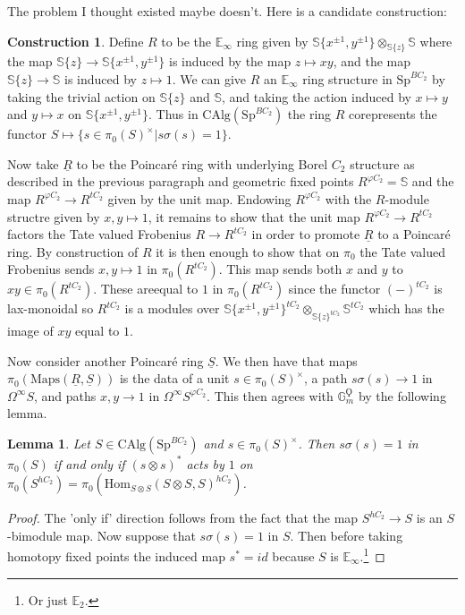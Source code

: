 \documentclass{article}
\renewcommand{\phi}{\varphi}
\newtheorem{lemma}[theorem]{Lemma}
\theoremstyle{definition}
\newtheorem{construction}[theorem]{Construction}
\begin{document}
The problem I thought existed maybe doesn't. Here is a candidate construction:

\begin{construction}
Define $R$ to be the $\mathbb{E}_\infty$ ring given by $\mathbb{S}\{x^{\pm 1}, y^{\pm 1}\}\otimes_{\mathbb{S}\{z\}}\mathbb{S}$ where the map $\mathbb{S}\{z\}\to \mathbb{S}\{x^{\pm 1}, y^{\pm 1}\}$ is induced by the map $z\mapsto xy$, and the map $\mathbb{S}\{z\}\to \mathbb{S}$ is induced by $z\mapsto 1$. We can give $R$ an $\mathbb{E}_\infty$ ring structure in $\mathrm{Sp}^{BC_2}$ by taking the trivial action on $\mathbb{S}\{z\}$ and $\mathbb{S}$, and taking the action induced by $x\mapsto y$ and $y\mapsto x$ on $\mathbb{S}\{x^{\pm 1}, y^{\pm 1}\}$. Thus in $\mathrm{CAlg}(\mathrm{Sp}^{BC_2})$ the ring $R$ corepresents the functor $S\mapsto \{s\in \pi_0(S)^\times| s\sigma(s)=1\}$.

Now take $\underline{R}$ to be the Poincar{\'e} ring with underlying Borel $C_2$ structure as described in the previous paragraph and geometric fixed points $R^{\phi C_2}=\mathbb{S}$ and the map $R^{\phi C_2}\to R^{tC_2}$ given by the unit map. Endowing $R^{\phi C_2}$ with the $R$-module structre given by $x,y\mapsto 1$, it remains to show that the unit map $R^{\phi C_2}\to R^{tC_2}$ factors the Tate valued Frobenius $R\to R^{tC_2}$ in order to promote $\underline{R}$ to a Poincar{\'e} ring. By construction of $R$ it is then enough to show that on $\pi_0$ the Tate valued Frobenius sends $x,y\mapsto 1$ in $\pi_0(R^{tC_2})$. This map sends both $x$ and $y$ to $xy\in \pi_0(R^{tC_2})$. These areequal to $1$ in $\pi_0(R^{tC_2})$ since the functor $(-)^{tC_2}$ is lax-monoidal so $R^{tC_2}$ is a modules over $\mathbb{S}\{x^{\pm 1}, y^{\pm 1}\}^{tC_2}\otimes_{\mathbb{S}\{z\}^{tC_2}}\mathbb{S}^{tC_2}$ which has the image of $xy$ equal to $1$. 
\end{construction}

Now consider another Poincar{\'e} ring $\underline{S}$. We then have that maps $\pi_0(\mathrm{Maps}(\underline{R},\underline{S}))$ is the data of a unit $s\in \pi_0(S)^\times$, a path $s\sigma(s)\to 1$ in $\Omega^\infty S$, and paths $x,y\to 1$ in $\Omega^\infty S^{\phi C_2}$.  This then agrees with $\mathbb{G}_m^\Qoppa$ by the following lemma.

\begin{lemma}
Let $S\in \mathrm{CAlg}(\mathrm{Sp}^{BC_2})$ and $s\in \pi_0(S)^\times$. Then $s\sigma(s)=1$ in $\pi_0(S)$ if and only if $(s\otimes s)^*$ acts by $1$ on $\pi_0(S^{hC_2})=\pi_0(\mathrm{Hom}_{S\otimes S}(S\otimes S, S)^{hC_2})$.
\end{lemma}
\begin{proof}
The 'only if' direction follows from the fact that the map $S^{hC_2}\to S$ is an $S$-bimodule map. Now suppose that $s\sigma(s)=1$ in  $S$. Then before taking homotopy fixed points the induced map $s^*=id$ because $S$ is $\mathbb{E}_\infty$.\footnote{Or just $\mathbb{E}_2$.} 
\end{proof}
\end{document}
